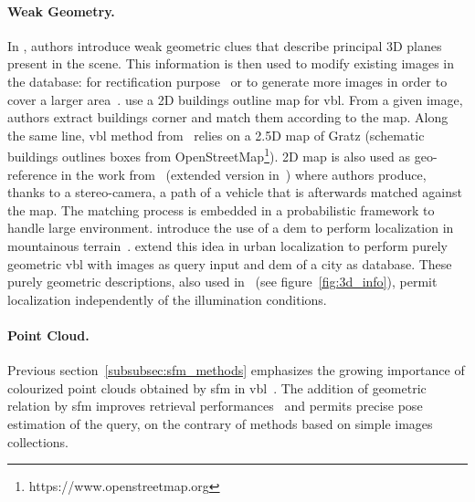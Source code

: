 		\paragraph{Weak Geometry.}
			\label{subsubsec:weak_geometry}			
			In \citep{Torii2015,Chen2011}, authors introduce weak geometric clues that describe principal 3D planes present in the scene. This information is then used to modify existing images in the database: for rectification purpose~\citep{Chen2011} or to generate more images in order to cover a larger area~\citep{Torii2015}. \citet{Cham2010} use a 2D buildings outline map for \ac{vbl}. From a given image, authors extract buildings corner and match them according to the map. Along the same line, \ac{vbl} method from~\citep{Arth2015,Armagan2017a,Armagan2017b,Armagan2017} relies on a 2.5D map of Gratz (schematic buildings outlines boxes from OpenStreetMap\footnote{https://www.openstreetmap.org}). 2D map is also used as geo-reference in the work from~\citep{Brubaker2013} (extended version in~\citep{Brubaker2016}) where authors produce, thanks to a stereo-camera, a path of a vehicle that is afterwards matched against the map. The matching process is embedded in a probabilistic framework to handle large environment. \citet{Baatz2012} introduce the use of a \ac{dem} to perform localization in mountainous terrain~\citep{Ramalingam2010,Tzeng2013,Chen2015}. \citet{Bansal2014} extend this idea in urban localization to perform purely geometric \ac{vbl} with images as query input and \ac{dem} of a city as database. These purely geometric descriptions, also used in~\citep{Matei2013,Christie2016,Ramalingam2010,Ramalingam2011} (see figure~\ref{fig:3d_info}), permit localization independently of the illumination conditions.

		\paragraph{Point Cloud.}
        \label{subsubsec:3d_geometry}
			Previous section~\ref{subsubsec:sfm_methods} emphasizes the growing importance of colourized point clouds obtained by \ac{sfm} in \ac{vbl}~\citep{Irschara2009,Li2010,Sattler2011,Sattler2012,Sattler2015,Middelberg2014,Lynen2015,Lu2015,Svarm2014,Zeisl2015,Svarm2016,Sattler2016a,Feng2016a}. The addition of geometric relation by \ac{sfm} improves retrieval performances~\citep{Sattler2012a} and permits precise pose estimation of the query, on the contrary of methods based on simple images collections.
			
